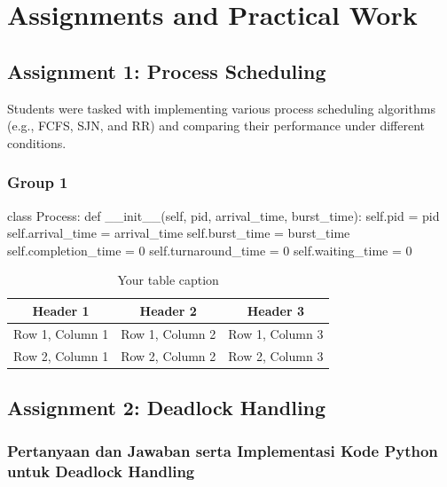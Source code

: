 \documentclass[12pt]{article}
\begin{document}
\section{Assignments and Practical Work}
\subsection{Assignment 1: Process Scheduling}
Students were tasked with implementing various process scheduling algorithms (e.g., FCFS, SJN, and RR) and comparing their performance under different conditions.
\subsubsection{Group 1}
\begin{python}
    class Process:
    def __init__(self, pid, arrival_time, burst_time):
        self.pid = pid
        self.arrival_time = arrival_time
        self.burst_time = burst_time
        self.completion_time = 0
        self.turnaround_time = 0
        self.waiting_time = 0
\end{python}

\begin{table}[htbp] %
    \centering
    \begin{tabular}{|c|c|c|} %
    \hline
    Header 1 & Header 2 & Header 3 \\ %
    \hline
    Row 1, Column 1 & Row 1, Column 2 & Row 1, Column 3 \\ %
    \hline
    Row 2, Column 1 & Row 2, Column 2 & Row 2, Column 3 \\ %
    \hline
    \end{tabular}
    \caption{Your table caption} %
    \label{tab:your_label} %
\end{table}
\subsection{Assignment 2: Deadlock Handling}

\subsubsection{Pertanyaan dan Jawaban serta Implementasi Kode Python untuk Deadlock Handling}
\end{document}

